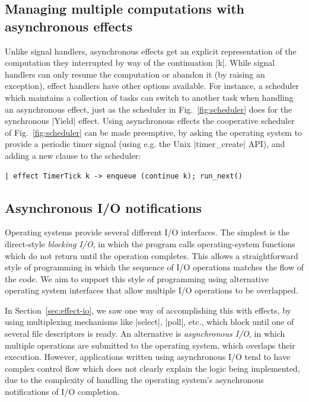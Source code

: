 \documentclass{llncs}
\begin{document}
\subsection{Managing multiple computations with asynchronous effects}

Unlike signal handlers, asynchronous effects get an explicit
representation of the computation they interrupted by way of the
continuation |k|. While signal handlers can only resume the
computation or abandon it (by raising an exception), effect handlers
have other options available. For instance, a scheduler which
maintains a collection of tasks can switch to another task when handling
an asynchronous effect, just as the scheduler in Fig.~\ref{fig:scheduler}
does for the synchronous |Yield| effect. Using
asynchronous effects the cooperative scheduler of Fig.~\ref{fig:scheduler} can be
made preemptive, by asking the operating system to provide a periodic
timer signal (using e.g. the Unix |timer_create| API), and adding a
new clause to the scheduler:
\begin{lstlisting}
| effect TimerTick k -> enqueue (continue k); run_next()
\end{lstlisting}

\subsection{Asynchronous I/O notifications}

Operating systems provide several different I/O interfaces.  The
simplest is the direct-style \emph{blocking I/O}, in which the program
calls operating-system functions which do not return until the
operation completes. This allows a straightforward style of
programming in which the sequence of I/O operations matches the flow
of the code. We aim to support this style of programming using
alternative operating system interfaces that allow multiple I/O
operations to be overlapped.

In Section~\ref{sec:effect-io}, we saw one way of accomplishing this
with effects, by using multiplexing mechanisms like
|select|, |poll|, etc., which block until one of several file
descriptors is ready. An alternative is
\emph{asynchronous I/O}, in which multiple operations are submitted to
the operating system, which overlaps their execution. However,
applications written using asynchronous I/O tend to have complex
control flow which does not clearly explain the logic being
implemented, due to the complexity of handling the operating system's
asynchronous notifications of I/O completion.
\end{document}
